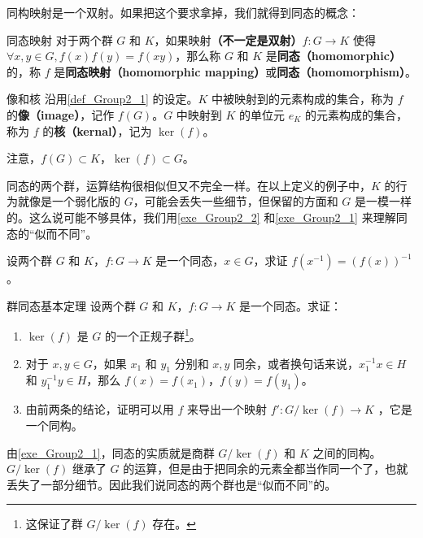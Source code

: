 同构映射是一个双射。如果把这个要求拿掉，我们就得到同态的概念：

\begin{definition}{同态映射}\label{def_Group2_1}
对于两个群 $G$ 和 $K$，如果映射\textbf{（不一定是双射）}$f:G\rightarrow K$ 使得 $\forall x, y\in G, f(x)f(y)=f(xy)$，那么称 $G$ 和 $K$ 是\textbf{同态（homomorphic）}的，称 $f$ 是\textbf{同态映射（homomorphic mapping）}或\textbf{同态（homomorphism）}。
\end{definition}

\begin{definition}{像和核}
沿用\autoref{def_Group2_1} 的设定。$K$ 中被映射到的元素构成的集合，称为 $f$ 的\textbf{像（image）}，记作 $f(G)$。$G$ 中映射到 $K$ 的单位元 $e_K$ 的元素构成的集合，称为 $f$ 的\textbf{核（kernal）}，记为 $\ker(f)$。
\end{definition}

注意，$f(G)\subset K$，$\ker(f)\subset G$。

同态的两个群，运算结构很相似但又不完全一样。在以上定义的例子中，$K$ 的行为就像是一个弱化版的 $G$，可能会丢失一些细节，但保留的方面和 $G$ 是一模一样的。这么说可能不够具体，我们用\autoref{exe_Group2_2} 和\autoref{exe_Group2_1} 来理解同态的“似而不同”。


\begin{exercise}{}\label{exe_Group2_2}
设两个群 $G$ 和 $K$，$f:G\rightarrow K$ 是一个同态，$x\in G$，求证 $f(x^{-1})=(f(x))^{-1}$。
\end{exercise}


\begin{exercise}{群同态基本定理}\label{exe_Group2_1}
设两个群 $G$ 和 $K$，$f:G\rightarrow K$ 是一个同态。求证：
\begin{enumerate}
\item $\ker(f)$ 是 $G$ 的一个正规子群\footnote{这保证了群 $G/\ker(f)$ 存在。}。
\item 对于 $x, y\in G$，如果 $x_1$ 和 $y_1$ 分别和 $x, y$ 同余，或者换句话来说，$x_1^{-1}x\in H$ 和 $y_1^{-1}y\in H$，那么 $f(x)=f(x_1)$，$f(y)=f(y_1)$。
\item 由前两条的结论，证明可以用 $f$ 来导出一个映射 $f': G/\ker(f)\rightarrow K$ ，它是一个同构。

\end{enumerate}
\end{exercise}

由\autoref{exe_Group2_1}，同态的实质就是商群 $G/\ker(f)$ 和 $K$ 之间的同构。$G/\ker(f)$ 继承了 $G$ 的运算，但是由于把同余的元素全都当作同一个了，也就丢失了一部分细节。因此我们说同态的两个群也是“似而不同”的。



